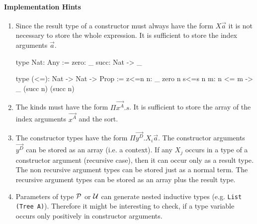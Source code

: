 \paragraph{Implementation Hints}
\begin{enumerate}
    \item Since the result type of a constructor must always have the form $X
        \vec a$ it is not necessary to store the whole expression. It is
        sufficient to store the index arguments $\vec a$.

        \begin{alba}
            type Nat: Any :=
                zero: _
                succ: Nat -> _

            type (<=): Nat -> Nat -> Prop
            :=
                z<=n {n}: _ zero n
                s<=s {n m}: n <= m -> _ (succ n) (succ n)
        \end{alba}

    \item The kinds must have the form $\Pi \vec{x^A}. s$. It is sufficient to
        store the array of the index arguments $\vec {x^A}$ and the sort.

    \item The constructor types have the form $\Pi \vec{y^D}. X_i \vec a$. The
        constructor arguments $\vec {y^D}$ can be stored as an array (i.e. a
        context). If any $X_j$ occurs in a type of a constructor argument
        (recursive case), then
        it can occur only as a result type. The non recursive argument types can
        be stored just as a normal term. The recursive argument types can be
        stored as an array plus the result type.

    \item Parameters of type ${\mathcal P}$ or ${\mathcal U}$ can generate nested inductive
        types (e.g. {\tt List (Tree A)}). Therefore it might be interesting to
        check, if a type variable occurs only positively in constructor
        arguments.
\end{enumerate}




